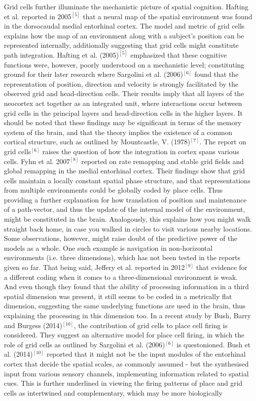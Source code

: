 Grid cells further illuminate the mechanistic picture of spatial cognition. Hafting et al. reported in 2005$^{[5]}$ that a neural map of the spatial environment was found in the dorsocaudal medial entorhinal cortex. The model and metric of grid cells explains how the map of an environment along with a subject’s position can be represented internally, additionally suggesting that grid cells might constitute path integration. Hafting et al. (2005)$^{[5]}$ emphasized that these cognitive functions were, however, poorly understood on a mechanistic level; constituting ground for their later research where Sargolini et al. (2006)$^{[6]}$ found that the representation of position, direction and velocity is strongly facilitated by the observed grid and head-direction cells. Their results imply that all layers of the neocortex act together as an integrated unit, where interactions occur between grid cells in the principal layers and head-direction cells in the higher layers. It should be noted that these findings may be significant in terms of the memory system of the brain, and that the theory implies the existence of a common cortical structure, such as outlined by Mountcastle, V. (1978)$^{[7]}$. The report on grid cells$^{[6]}$ raises the question of how the integration in cortex spans various cells. Fyhn et al. 2007$^{[8]}$ reported on rate remapping and stable grid fields and global remapping in the medial entorhinal cortex. Their findings show that grid cells maintain a locally constant spatial phase structure, and that representations from multiple environments could be globally coded by place cells. Thus providing a further explanation for how translation of position and maintenance of a path-vector, and thus the update of the internal model of the environment, might be constituted in the brain. Analogously, this explains how you might walk straight back home, in case you walked in circles to visit various nearby locations. Some observations, however, might raise doubt of the predictive power of the models as a whole. One such example is navigation in non-horizontal environments (i.e. three dimensions), which has not been tested in the reports given so far. That being said, Jeffery et al. reported in 2012$^{[9]}$ that evidence for a different coding when it comes to a three-dimensional environment is weak. And even though they found that the ability of processing information in a third spatial dimension was present, it still seems to be coded in a metrically flat dimension, suggesting the same underlying functions are used in the brain, thus explaining the processing in this dimension too. In a recent study by Bush, Barry and Burgess (2014)$^{[10]}$, the contribution of grid cells to place cell firing is considered. They suggest an alternative model for place cell firing, in which the role of grid cells as outlined by Sargolini et al. (2006)$^{[6]}$ is questonioned. Bush et al. (2014)$^{[10]}$ reported that it might not be the input modules of the entorhinal cortex that decide the spatial scales, as commonly assumed - but the synthesised input from various sensory channels, implementing information related to spatial cues. This is further underlined in viewing the firing patterns of place and grid cells as intertwined and complementary, which may be more biologically 